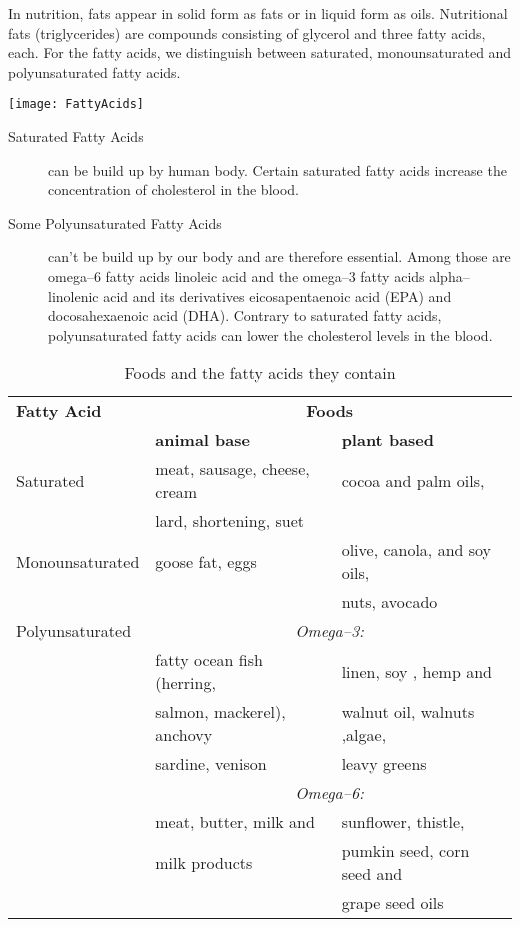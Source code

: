 \documentclass[../main.tex]{subfiles}
\begin{document}
In nutrition, fats appear in solid form as fats or in liquid form as oils.
Nutritional fats (triglycerides) are compounds consisting of glycerol and three fatty acids, each.
For the fatty acids, we distinguish  between saturated,
monounsaturated and polyunsaturated fatty acids.

\vspace{3mm}
{\centering
  \texttt{[image: FattyAcids]}
}

\begin{description}
\item[Saturated Fatty Acids] can be build up by human body.
  Certain saturated fatty acids increase the concentration of cholesterol in the blood.
\item[Some Polyunsaturated Fatty Acids] can't be build up by our body and are therefore essential.
  Among those are omega--6 fatty acids linoleic acid and the
  omega--3 fatty acids alpha--linolenic acid and its derivatives
  eicosapentaenoic acid (EPA) and docosahexaenoic acid (DHA).
  Contrary to saturated fatty acids, polyunsaturated fatty acids can lower the cholesterol levels in the blood.
\end{description}

\begin{table}[htb!]
  \centering
  \begin{tabular}{l|ll}
    \textbf{Fatty Acid} & \multicolumn{2}{c}{\textbf{Foods}} \\
                        & \textbf{animal base} & \textbf{plant based} \\
    \hline
    Saturated & meat, sausage, cheese, cream & cocoa and palm oils, \\
                        & lard, shortening, suet \\
    Monounsaturated & goose fat, eggs & olive, canola, and soy oils, \\
                        & & nuts, avocado \\
    Polyunsaturated & \multicolumn{2}{c}{\textit{Omega--3:}} \\
                        & fatty ocean fish (herring,  & linen, soy , hemp and \\
                        & salmon, mackerel), anchovy & walnut oil, walnuts ,algae,\\
                        & sardine, venison & leavy greens \\
  & \multicolumn{2}{c}{\textit{Omega--6:}} \\  
                        & meat, butter, milk and & sunflower, thistle, \\
                        & milk products & pumkin seed, corn seed and \\
                        & & grape seed oils \\

  \end{tabular}
  \caption{Foods and the fatty acids they contain}
\end{table}
\end{document}
